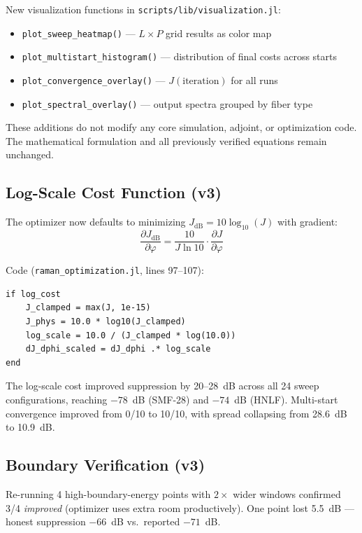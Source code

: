 \documentclass[12pt,a4paper]{article}
\newcommand{\pdv}[2]{\frac{\partial #1}{\partial #2}}
\theoremstyle{definition}
\begin{document}
New visualization functions in \texttt{scripts/lib/visualization.jl}:
\begin{itemize}[leftmargin=*]
\item \texttt{plot\_sweep\_heatmap()} --- $L \times P$ grid results as color map
\item \texttt{plot\_multistart\_histogram()} --- distribution of final costs across starts
\item \texttt{plot\_convergence\_overlay()} --- $J(\text{iteration})$ for all runs
\item \texttt{plot\_spectral\_overlay()} --- output spectra grouped by fiber type
\end{itemize}

These additions do not modify any core simulation, adjoint, or optimization code. The mathematical formulation and all previously verified equations remain unchanged.

\subsection{Log-Scale Cost Function (v3)}

The optimizer now defaults to minimizing $J_{\text{dB}} = 10\log_{10}(J)$ with gradient:
\begin{equation}
\pdv{J_{\text{dB}}}{\varphi} = \frac{10}{J\ln 10}\cdot\pdv{J}{\varphi}
\end{equation}

Code (\texttt{raman\_optimization.jl}, lines 97--107):
\begin{lstlisting}
if log_cost
    J_clamped = max(J, 1e-15)
    J_phys = 10.0 * log10(J_clamped)
    log_scale = 10.0 / (J_clamped * log(10.0))
    dJ_dphi_scaled = dJ_dphi .* log_scale
end
\end{lstlisting}

\begin{keyresult}
The log-scale cost improved suppression by 20--28~dB across all 24 sweep configurations, reaching $-78$~dB (SMF-28) and $-74$~dB (HNLF). Multi-start convergence improved from 0/10 to 10/10, with spread collapsing from 28.6~dB to 10.9~dB.
\end{keyresult}

\subsection{Boundary Verification (v3)}

Re-running 4 high-boundary-energy points with $2\times$ wider windows confirmed 3/4 \emph{improved} (optimizer uses extra room productively). One point lost 5.5~dB --- honest suppression $-66$~dB vs.\ reported $-71$~dB.
\end{document}
